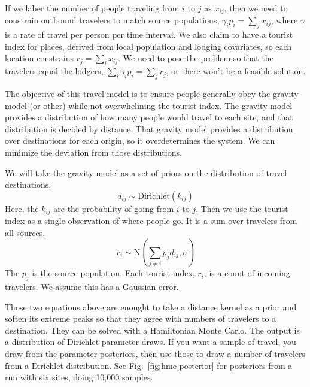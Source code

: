 \documentclass{article}
\begin{document}
If we laber the number of people traveling from $i$ to $j$ as $x_{ij}$, then we need to constrain outbound travelers to match source populations, $\gamma_i p_i = \sum_j x_{ij}$, where $\gamma$ is a rate of travel per person per time interval. We also claim to have a tourist index for places, derived from local population and lodging covariates, so each location constrains $r_j = \sum_i x_{ij}$. We need to pose the problem so that the travelers equal the lodgers, $\sum_i \gamma_i p_i = \sum_j r_j$, or there won't be a feasible solution.

The objective of this travel model is to ensure people generally obey the gravity model (or other) while not overwhelming the tourist index. The gravity model provides a distribution of how many people would travel to each site, and that distribution is decided by distance. That gravity model provides a distribution over destinations for each origin, so it overdetermines the system. We can minimize the deviation from those distributions.

We will take the gravity model as a set of priors on the distribution of travel destinations.
\begin{equation}
  d_{ij} \sim \mbox{Dirichlet}(k_{ij})
\end{equation}
Here, the $k_{ij}$ are the probability of going from $i$ to $j$. Then we use the tourist index as a single observation of where people go. It is a sum over travelers from all sources.
\begin{equation}
  r_i \sim \mbox{N}\left(\sum_{j\ne i} p_j d_{ij}, \sigma \right)
\end{equation}
The $p_j$ is the source population. Each tourist index, $r_i$, is a count of incoming travelers. We assume this has a Gaussian error.

Those two equations above are enought to take a distance kernel as a prior and soften its extreme peaks so that they agree with numbers of travelers to a destination. They can be solved with a Hamiltonian Monte Carlo. The output is a distribution of Dirichlet parameter draws. If you want a sample of travel, you draw from the parameter posteriors, then use those to draw a number of travelers from a Dirichlet distribution. See Fig.~\ref{fig:hmc-posterior} for posteriors from a run with six sites, doing 10,000 samples.
\end{document}
